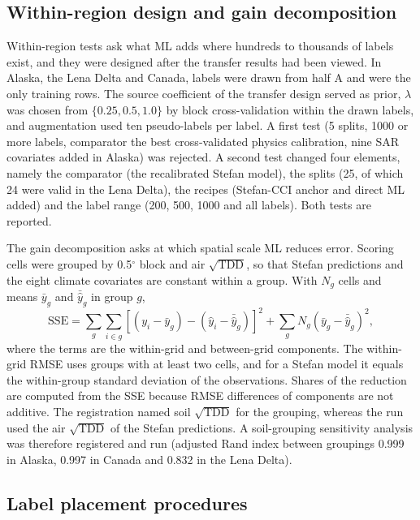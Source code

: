 \subsection{Within-region design and gain decomposition}\label{sec:m-within}

Within-region tests ask what ML adds where hundreds to thousands of labels exist, and they were designed after the transfer results had been viewed. In Alaska, the Lena Delta and Canada, labels were drawn from half A and were the only training rows. The source coefficient of the transfer design served as prior, $\lambda$ was chosen from $\{0.25, 0.5, 1.0\}$ by block cross-validation within the drawn labels, and augmentation used ten pseudo-labels per label. A first test (5 splits, 1000 or more labels, comparator the best cross-validated physics calibration, nine SAR covariates added in Alaska) was rejected. A second test changed four elements, namely the comparator (the recalibrated Stefan model), the splits (25, of which 24 were valid in the Lena Delta), the recipes (Stefan-CCI anchor and direct ML added) and the label range (200, 500, 1000 and all labels). Both tests are reported.

The gain decomposition asks at which spatial scale ML reduces error. Scoring cells were grouped by 0.5$^{\circ}$ block and air $\sqrt{\mathrm{TDD}}$, so that Stefan predictions and the eight climate covariates are constant within a group. With $N_g$ cells and means $\bar{y}_g$ and $\bar{\hat{y}}_g$ in group $g$,
\begin{equation}
\mathrm{SSE} = \sum_g \sum_{i \in g} \left[(y_i - \bar{y}_g) - (\hat{y}_i - \bar{\hat{y}}_g)\right]^2 + \sum_g N_g \left(\bar{y}_g - \bar{\hat{y}}_g\right)^2,
\label{eq:decomp}
\end{equation}
where the terms are the within-grid and between-grid components. The within-grid RMSE uses groups with at least two cells, and for a Stefan model it equals the within-group standard deviation of the observations. Shares of the reduction are computed from the SSE because RMSE differences of components are not additive. The registration named soil $\sqrt{\mathrm{TDD}}$ for the grouping, whereas the run used the air $\sqrt{\mathrm{TDD}}$ of the Stefan predictions. A soil-grouping sensitivity analysis was therefore registered and run (adjusted Rand index between groupings 0.999 in Alaska, 0.997 in Canada and 0.832 in the Lena Delta).

\subsection{Label placement procedures}\label{sec:m-placement}

